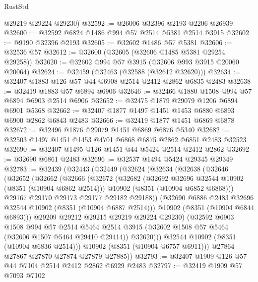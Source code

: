\begin{lexlean}{RustStd}
\begin{coremodule}
      @29219
      @29224
      @29230)
@32592 := @26006 @32396 @2193 @2206 @26939
@32600 := @32592 @6824 @1486 @994 @57 @2514 @5381 @2514 @3915
@32602 := @9190 @32396 @2193
@32605 := @32602 @1486 @57 @5381
@32606 := @32536 @57
@32612 := @32600 (@32605 (@32606 @1485 @5381 @29254 @29258))
@32620 := @32602 @994 @57 @3915 (@32606 @993 @3915 @20060 @20064)
@32624 := @32459 (@32463 (@32588 (@32612 @32620)))
@32634 := @32407 @1883 @126 @57 @44 @6908 @2514 @2412 @2862 @6835 @2483
@32638 := @32419 @1883 @57 @6894 @6906
@32646 := @32466 @1880 @1508 @994 @57 @6894 @6903 @2514 @6906
@32652 := @32475 @1879 @29079 @1206 @6894 @6901 @5368
@32662 := @32407 @1877 @1497 @1451 @1453 @6880 @6893 @6900 @2862 @6843 @2483
@32666 := @32419 @1877 @1451 @6869 @6878
@32672 := @32496 @1876 @29079 @1451 @6869 @6876 @5340
@32682 := @32503 @1497 @1451 @1453 @4701 @6868 @6875 @2862 @6851 @2483 @32523
@32690 := @32407 @1495 @126 @1451 @44 @5424 @2514 @2412 @2862
@32692 := @32690 @6861 @2483
@32696 := @32537 @1494 @5424 @29345 @29349
@32783 := @32439
    (@32443
      (@32449
        (@32624
          (@32634
            (@32638
              (@32646
                (@32652
                  (@32662
                    (@32666
                      (@32672
                        (@32682
                          (@32692 @32696 @32544 @10902 (@8351 (@10904 @6862 @2514)))
                          @10902
                          (@8351 (@10904 @6852 @6868)))
                        @29167
                        @29170
                        @29173
                        @29177
                        @29182
                        @29188))
                    (@32690 @6886 @2483 @32696 @32544 @10902 (@8351 (@10904 @6887 @2514)))
                    @10902
                    (@8351 (@10904 @6844 @6893)))
                  @29209
                  @29212
                  @29215
                  @29219
                  @29224
                  @29230)
                (@32592
                  @6903
                  @1508
                  @994
                  @57
                  @2514
                  @5464
                  @2514
                  @3915
                  (@32602 @1508 @57 @5464 (@32606 @1507 @5464 @29410 @29414))
                  @32620)))
            @32544
            @10902
            (@8351 (@10904 @6836 @2514)))
          @10902
          (@8351 (@10904 @6757 @6911)))
        @27864
        @27867
        @27870
        @27874
        @27879
        @27885))
@32793 := @32407 @1909 @126 @57 @44 @7104 @2514 @2412 @2862 @6929 @2483
@32797 := @32419 @1909 @57 @7093 @7102

\end{coremodule}
\end{lexlean}
